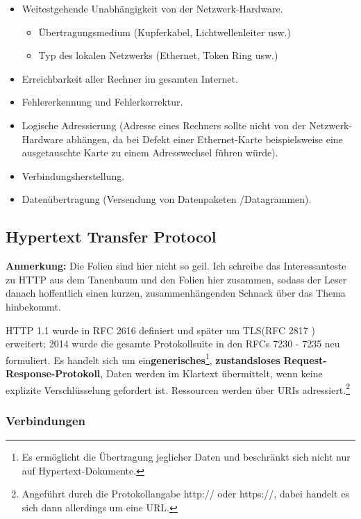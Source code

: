 \documentclass{article} %
\begin{document}
\begin{itemize}
	\item Weitestgehende Unabhängigkeit von der Netzwerk-Hardware.
	\begin{itemize}
		\item Übertragungsmedium (Kupferkabel, Lichtwellenleiter usw.)
		\item Typ des lokalen Netzwerks (Ethernet, Token Ring usw.)
	\end{itemize}
	\item Erreichbarkeit aller Rechner im gesamten Internet.
	\item Fehlererkennung und Fehlerkorrektur.
	\item Logische Adressierung (Adresse eines Rechners sollte nicht von der Netzwerk-Hardware abhängen, da bei Defekt einer Ethernet-Karte beispielsweise eine ausgetauschte Karte zu einem Adresswechsel führen würde).
	\item Verbindungsherstellung.
	\item Datenübertragung (Versendung von Datenpaketen /Datagrammen).
\end{itemize}

\subsection{Hypertext Transfer Protocol}
\begin{framed}
\textbf{Anmerkung: } Die Folien sind hier nicht so geil.
Ich schreibe das Interessanteste zu HTTP aus dem Tanenbaum\cite{tanenbaum2003computer} und den Folien hier zusammen, sodass der Leser danach hoffentlich einen kurzen, zusammenhängenden Schnack über das Thema hinbekommt.
\end{framed}

HTTP 1.1 wurde in RFC 2616\cite{rfc2616} definiert und später um  TLS(RFC 2817 \cite{rfc2817}) erweitert; 2014 wurde die gesamte Protokollsuite in den RFCs 7230 - 7235 neu formuliert\cite{rfc7230,rfc7231,rfc7232,rfc7233,rfc7234,rfc7235}.
Es handelt sich um ein\textbf{generisches}\footnote{Es ermöglicht die Übertragung jeglicher Daten und beschränkt sich nicht nur auf Hypertext-Dokumente.}, \textbf{zustandsloses} \textbf{Request-Response-Protokoll}, 
Daten werden im Klartext übermittelt, wenn keine explizite Verschlüsselung gefordert ist.
Ressourcen werden über URIs\cite{rfc2396} adressiert.\footnote{Angeführt durch die Protokollangabe http:// oder https://, dabei handelt es sich dann allerdings um eine URL.}

\subsubsection{Verbindungen}
\end{document}
